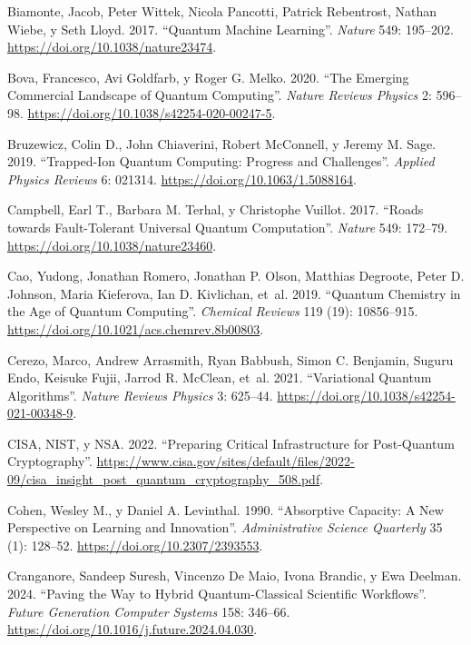 \documentclass[
  11pt,
  letterpaper,
]{article}
\newlength{\cslhangindent}
\newenvironment{CSLReferences}[2] %
 {\begin{list}{}{%
  \setlength{\itemindent}{0pt}
  \setlength{\leftmargin}{0pt}
  \setlength{\parsep}{0pt}
  \ifodd #1
   \setlength{\leftmargin}{\cslhangindent}
   \setlength{\itemindent}{-1\cslhangindent}
  \fi
  \setlength{\itemsep}{#2\baselineskip}}}
 {\end{list}}
\begin{document}
\begin{CSLReferences}{1}{0}
Biamonte, Jacob, Peter Wittek, Nicola Pancotti, Patrick Rebentrost,
Nathan Wiebe, y Seth Lloyd. 2017. {``Quantum Machine Learning''}.
\emph{Nature} 549: 195--202. \url{https://doi.org/10.1038/nature23474}.

Bova, Francesco, Avi Goldfarb, y Roger G. Melko. 2020. {``The Emerging
Commercial Landscape of Quantum Computing''}. \emph{Nature Reviews
Physics} 2: 596--98. \url{https://doi.org/10.1038/s42254-020-00247-5}.

Bruzewicz, Colin D., John Chiaverini, Robert McConnell, y Jeremy M.
Sage. 2019. {``Trapped-Ion Quantum Computing: Progress and
Challenges''}. \emph{Applied Physics Reviews} 6: 021314.
\url{https://doi.org/10.1063/1.5088164}.

Campbell, Earl T., Barbara M. Terhal, y Christophe Vuillot. 2017.
{``Roads towards Fault-Tolerant Universal Quantum Computation''}.
\emph{Nature} 549: 172--79. \url{https://doi.org/10.1038/nature23460}.

Cao, Yudong, Jonathan Romero, Jonathan P. Olson, Matthias Degroote,
Peter D. Johnson, Maria Kieferova, Ian D. Kivlichan, et~al. 2019.
{``Quantum Chemistry in the Age of Quantum Computing''}. \emph{Chemical
Reviews} 119 (19): 10856--915.
\url{https://doi.org/10.1021/acs.chemrev.8b00803}.

Cerezo, Marco, Andrew Arrasmith, Ryan Babbush, Simon C. Benjamin, Suguru
Endo, Keisuke Fujii, Jarrod R. McClean, et~al. 2021. {``Variational
Quantum Algorithms''}. \emph{Nature Reviews Physics} 3: 625--44.
\url{https://doi.org/10.1038/s42254-021-00348-9}.

CISA, NIST, y NSA. 2022. {``Preparing Critical Infrastructure for
Post-Quantum Cryptography''}.
\url{https://www.cisa.gov/sites/default/files/2022-09/cisa_insight_post_quantum_cryptography_508.pdf}.

Cohen, Wesley M., y Daniel A. Levinthal. 1990. {``Absorptive Capacity: A
New Perspective on Learning and Innovation''}. \emph{Administrative
Science Quarterly} 35 (1): 128--52.
\url{https://doi.org/10.2307/2393553}.

Cranganore, Sandeep Suresh, Vincenzo De Maio, Ivona Brandic, y Ewa
Deelman. 2024. {``Paving the Way to Hybrid Quantum-Classical Scientific
Workflows''}. \emph{Future Generation Computer Systems} 158: 346--66.
\url{https://doi.org/10.1016/j.future.2024.04.030}.


\end{CSLReferences}
\end{document}
